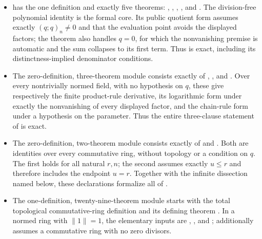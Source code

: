 \documentclass[11pt,a4paper,oneside,openany]{book}
\theoremstyle{definition}
\theoremstyle{remark}
\begin{document}
\begin{itemize}
\item {} has the one definition
 and exactly five theorems:
,
,
,
, and
.  The division-free
polynomial identity is the formal core.  Its public quotient form assumes
exactly \((q;q)_n\ne0\) and that the evaluation point avoids the displayed
factors; the theorem also handles \(q=0\), for which the nonvanishing premise
is automatic and the sum collapses to its first term.  Thus
 is
exact, including its distinctness-implied denominator conditions.

\item The zero-definition, three-theorem module
 consists exactly of
,
, and
.  Over every nontrivially
normed field, with no hypothesis on \(q\), these give respectively the
finite product-rule derivative, its logarithmic form under exactly the
nonvanishing of every displayed factor, and the chain-rule form under a
 hypothesis on the parameter.  Thus the entire three-clause
statement of  is exact.

\item The zero-definition, two-theorem module
 consists exactly of
 and
.  Both are identities
over every commutative ring, without topology or a condition on $q$.  The
first holds for all natural $r,n$; the second assumes exactly $u\le r$ and
therefore includes the endpoint $u=r$.  Together with the infinite
dissection named below, these declarations formalize all of
.

\item The one-definition, twenty-nine-theorem module
 starts with the total topological
commutative-ring definition  and its defining
theorem .  In a normed ring with
$\lVert1\rVert=1$, the elementary inputs are
,
, and
;
 additionally assumes a
commutative ring with no zero divisors.


\end{itemize}
\end{document}
